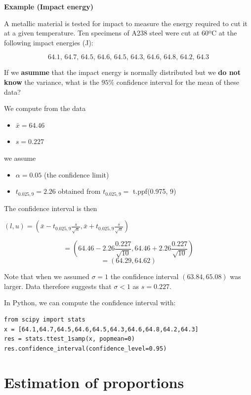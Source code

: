 \documentclass[
]{book}
\providecommand{\tightlist}{%
  \setlength{\itemsep}{0pt}\setlength{\parskip}{0pt}}
\begin{document}
\textbf{Example (Impact energy)}

A metallic material is tested for impact to measure the energy required to cut it at a given temperature. Ten specimens of A238 steel were cut at 60ºC at the following impact energies (J):

\[64.1,\, 64.7,\, 64.5,\, 64.6,\, 64.5,\, 64.3,\, 64.6,\, 64.8,\, 64.2,\, 64.3\]

If we \textbf{asumme} that the impact energy is normally distributed but we \textbf{do not know} the variance, what is the \(95\%\) confidence interval for the mean of these data?

We compute from the data

\begin{itemize}
\tightlist
\item
  \(\bar{x}=64.46\)
\item
  \(s=0.227\)
\end{itemize}

we assume

\begin{itemize}
\tightlist
\item
  \(\alpha=0.05\) (the confidence limit)
\item
  \(t_{0.025,9}=2.26\) obtained from \(t_{0.025,9}=\) t.ppf(0.975, 9)
\end{itemize}

The confidence interval is then

\((l,u)=(\bar{x}- t_{0.025,9}\frac{s}{\sqrt{n}},\bar{x}+t_{0.025,9} \frac{s}{\sqrt{n}})\)

\[=(64.46-2.26 \frac{0.227}{\sqrt{10}},64.46+2.26 \frac{0.227}{\sqrt{10}})\] \[=(64.29,64.62)\]

Note that when we assumed \(\sigma=1\) the confidence interval \((63.84,65.08)\) was larger. Data therefore suggests that \(\sigma<1\) as \(s=0.227\).

In Python, we can compute the confidence interval with:

\begin{verbatim}
from scipy import stats
x = [64.1,64.7,64.5,64.6,64.5,64.3,64.6,64.8,64.2,64.3]
res = stats.ttest_1samp(x, popmean=0)
res.confidence_interval(confidence_level=0.95)
\end{verbatim}

\hypertarget{estimation-of-proportions}{%
\section{Estimation of proportions}\label{estimation-of-proportions}}
\end{document}
